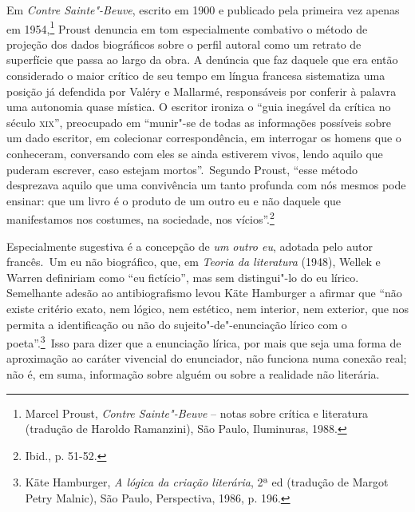 Em \emph{Contre Sainte"-Beuve}, escrito em 1900 e publicado pela primeira
vez apenas em 1954,\footnote{Marcel Proust, \emph{Contre Sainte"-Beuve} -- notas sobre crítica e literatura (tradução de Haroldo Ramanzini), São Paulo, Iluminuras, 1988.} Proust denuncia em tom
especialmente combativo o método de projeção dos dados biográficos sobre
o perfil autoral como um retrato de superfície que passa ao largo da
obra. A denúncia que faz daquele que era então considerado o maior
crítico de seu tempo em língua francesa sistematiza uma posição já
defendida por Valéry e Mallarmé, responsáveis por conferir à palavra uma
autonomia quase mística. O escritor ironiza o ``guia inegável da crítica
no século \textsc{xix}'', preocupado em ``munir"-se de todas as
informações possíveis sobre um dado escritor, em colecionar
correspondência, em interrogar os homens que o conheceram, conversando
com eles se ainda estiverem vivos, lendo aquilo que puderam escrever,
caso estejam mortos''.~Segundo Proust, ``esse método desprezava aquilo
que uma convivência um tanto profunda com nós mesmos pode ensinar: que
um livro é o produto de um outro eu e não daquele que manifestamos nos
costumes, na sociedade, nos vícios''.\footnote{Ibid., p. 51-52.}

Especialmente sugestiva é a concepção de \emph{um outro eu}, adotada
pelo autor francês.~Um eu não biográfico, que, em \emph{Teoria da
literatura} (1948), Wellek e Warren definiriam como ``eu fictício'', mas
sem distingui"-lo do eu lírico. Semelhante adesão ao antibiografismo
levou Käte Hamburger a afirmar que ``não existe critério exato, nem
lógico, nem estético, nem interior, nem exterior, que nos permita a
identificação ou não do sujeito"-de"-enunciação lírico com o
poeta''.\footnote{Käte Hamburger, \emph{A lógica da criação literária}, 2ª ed (tradução de Margot Petry Malnic), São Paulo, Perspectiva, 1986, p. 196.}~Isso para dizer que a enunciação lírica, por mais que seja
uma forma de aproximação ao caráter vivencial do enunciador, não
funciona numa conexão real; não é, em suma, informação sobre alguém ou
sobre a realidade não literária.

